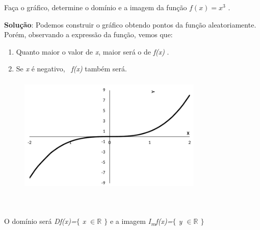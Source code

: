 \begin{texemplo}
	
Faça o gráfico, determine o domínio e a imagem da função  \( f \left( x \right) =x^{3} \) .

\begin{justify}
\textbf{Solução}: Podemos construir o gráfico obtendo pontos da função aleatoriamente. Porém, observando a expressão da função, vemos que: 
\end{justify}

\begin{enumerate}[label=(\roman*)]
    \item Quanto maior o valor de \textit{x}, maior será o de \textit{f(x) }.

	\item Se \textit{x} é negativo,~ \textit{f(x) }também será.
\end{enumerate}
\begin{figure}[H]
	\begin{Center}
		\includegraphics[width=3.46in,height=2.22in]{capitulos/outras_funcoes/media/image16.pdf}
	\end{Center}
\end{figure}

~~

\begin{justify}
O domínio será \textit{Df(x)=$ \{ $ x $ \in \mathbb{R} $  \textbf{ }$ \} $ } e a imagem  \textit{I\textsubscript{m}f(x)=$ \{ $ y $ \in \mathbb{R} $ \textbf{ }$ \} $ } \qedsymbol{}
\end{justify}
\end{texemplo}

